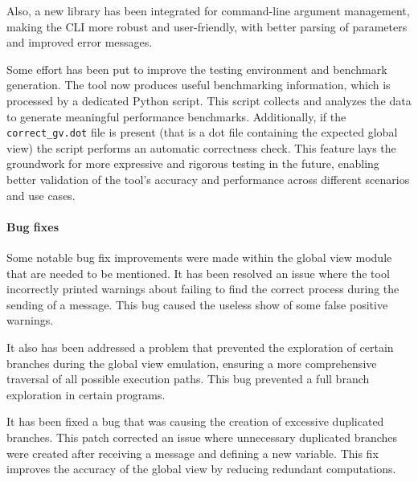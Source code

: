 Also, a new library has been integrated for command-line argument management,  
making the CLI more robust and user-friendly, with better parsing of  
parameters and improved error messages.

Some effort has been put to improve the testing environment and benchmark 
generation. The tool now produces useful benchmarking information, which is 
processed by a dedicated Python script. This script collects and analyzes the 
data to generate meaningful performance benchmarks. Additionally, if the  
\texttt{correct\_gv.dot} file is present (that is a dot file containing 
the expected global view) the script performs an automatic correctness check. 
This feature lays the groundwork for more expressive and rigorous testing in 
the future, enabling better validation of the tool's accuracy and performance
across different scenarios and use cases.

\paragraph{Bug fixes}
Some notable bug fix improvements were made within the global view module that 
are needed to be mentioned. It has been resolved an issue where the tool
incorrectly printed warnings about failing to find the correct process during
the sending of a message. This bug caused the useless show of some false 
positive warnings. 

It also has been addressed a problem that prevented the exploration of certain
branches during the global view emulation, ensuring a more comprehensive
traversal of all possible execution paths. This bug prevented a full branch
exploration in certain programs. 

It has been fixed a bug that was causing the creation of excessive duplicated
branches. This patch corrected an issue where unnecessary duplicated branches 
were created after receiving a message and defining a new variable. This fix
improves the accuracy of the global view by reducing redundant computations.  
